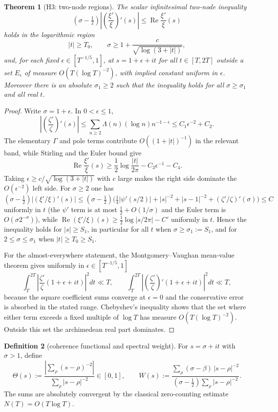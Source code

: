 \documentclass[11pt]{amsart}
\newtheorem{theorem}{Theorem}[section]
\theoremstyle{definition}
\newtheorem{definition}[theorem]{Definition}
\theoremstyle{remark}
\theoremstyle{definition}
\renewcommand{\Re}{\operatorname{Re}}
\newcommand{\half}{\tfrac{1}{2}}
\begin{document}
\begin{theorem}[H3: two-node regions]\label{thm:live-H3}
The scalar infinitesimal two-node inequality
\[
   (\sigma-\half)\left|\left(\frac{\xi'}{\xi}\right)'(s)\right|
   \le
   \Re\frac{\xi'}{\xi}(s)
\]
holds in the logarithmic region
\[
   |t|\ge T_0,\qquad \sigma\ge1+\frac{c}{\sqrt{\log(3+|t|)}},
\]
and, for each fixed $\epsilon\in[T^{-1/5},1]$, at $s=1+\epsilon+it$ for all $t\in[T,2T]$ outside a
set $E_\epsilon$ of measure $O(T(\log T)^{-2})$, with implied constant uniform in $\epsilon$.
Moreover there is an absolute $\sigma_1\ge2$ such that the inequality holds for all $\sigma\ge\sigma_1$
and all real $t$.
\end{theorem}

\begin{proof}
Write $\sigma=1+\epsilon$.  In $0<\epsilon\le1$,
\[
   \left|\left(\frac{\zeta'}{\zeta}\right)'(s)\right|
   \le \sum_{n\ge2}\Lambda(n)(\log n)n^{-1-\epsilon}
   \le C_1\epsilon^{-2}+C_2.
\]
The elementary $\Gamma$ and pole terms contribute $O((1+|t|)^{-1})$ in the relevant band, while
Stirling and the Euler bound give
\[
   \Re\frac{\xi'}{\xi}(s)
   \ge \frac12\log\frac{|t|}{2\pi}-C_3\epsilon^{-1}-C_4.
\]
Taking $\epsilon\ge c/\sqrt{\log(3+|t|)}$ with $c$ large makes the right side dominate the
$O(\epsilon^{-2})$ left side.  For $\sigma\ge2$ one has
$(\sigma-\half)|(\xi'/\xi)'(s)|\le(\sigma-\half)\bigl(\tfrac14|\psi'(s/2)|+|s|^{-2}+|s-1|^{-2}
+(\zeta'/\zeta)'(\sigma)\bigr)\le C$ uniformly in $t$ (the $\psi'$ term is at most $\half+O(1/\sigma)$
and the Euler term is $O(\sigma2^{-\sigma})$), while $\Re(\xi'/\xi)(s)\ge\half\log|s/2\pi|-C'$
uniformly in $t$.  Hence the inequality holds for $|s|\ge S_1$, in particular for all $t$ when
$\sigma\ge\sigma_1:=S_1$, and for $2\le\sigma\le\sigma_1$ when $|t|\ge T_0\ge S_1$.

For the almost-everywhere statement, the Montgomery--Vaughan mean-value theorem gives uniformly in
$\epsilon\in[T^{-1/5},1]$
\[
   \int_T^{2T}\left|\frac{\zeta'}{\zeta}(1+\epsilon+it)\right|^2dt\ll T,\qquad
   \int_T^{2T}\left|\left(\frac{\zeta'}{\zeta}\right)'(1+\epsilon+it)\right|^2dt\ll T,
\]
because the square coefficient sums converge at $\epsilon=0$ and the conservative error is absorbed in
the stated range.  Chebyshev's inequality shows that the set where either term exceeds a fixed multiple
of $\log T$ has measure $O(T(\log T)^{-2})$.  Outside this set the archimedean real part dominates.
\end{proof}

\begin{definition}[coherence functional and spectral weight]\label{def:coherence}
For $s=\sigma+it$ with $\sigma>1$, define
\[
   \Theta(s):=
   \frac{\left|\sum_\rho (s-\rho)^{-2}\right|}
        {\sum_\rho|s-\rho|^{-2}}\in[0,1],
   \qquad
   W(s):=
   \frac{\sum_\rho(\sigma-\beta)\,|s-\rho|^{-2}}
        {(\sigma-\half)\sum_\rho|s-\rho|^{-2}}.
\]
The sums are absolutely convergent by the classical zero-counting estimate
$N(T)=O(T\log T)$.
\end{definition}
\end{document}
